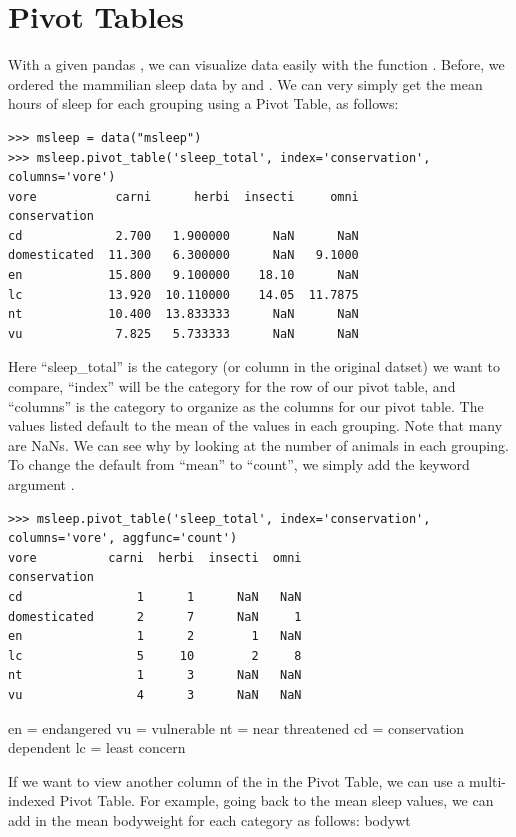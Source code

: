 \section*{Pivot Tables}
With a given pandas , we can visualize data easily with the function . Before, we ordered the mammilian sleep data by  and .  We can very simply get the mean hours of sleep for each grouping using a Pivot Table, as follows:

\begin{lstlisting}
>>> msleep = data("msleep")
>>> msleep.pivot_table('sleep_total', index='conservation', columns='vore')
vore           carni      herbi  insecti     omni
conservation                                     
cd             2.700   1.900000      NaN      NaN
domesticated  11.300   6.300000      NaN   9.1000
en            15.800   9.100000    18.10      NaN
lc            13.920  10.110000    14.05  11.7875
nt            10.400  13.833333      NaN      NaN
vu             7.825   5.733333      NaN      NaN
\end{lstlisting}

Here ``sleep\_total'' is the category (or column in the original datset) we want to compare, ``index'' will be the category for the row of our pivot table, and ``columns'' is the category to organize as the columns for our pivot table.  The values listed default to the mean of the values in each grouping.  Note that many are NaNs.  We can see why by looking at the number of animals in each grouping.  To change the default from ``mean'' to ``count'', we simply add the keyword argument .

\begin{lstlisting}
>>> msleep.pivot_table('sleep_total', index='conservation', columns='vore', aggfunc='count')
vore          carni  herbi  insecti  omni
conservation                             
cd                1      1      NaN   NaN
domesticated      2      7      NaN     1
en                1      2        1   NaN
lc                5     10        2     8
nt                1      3      NaN   NaN
vu                4      3      NaN   NaN
\end{lstlisting}

en = endangered
vu = vulnerable
nt = near threatened
cd = conservation dependent
lc = least concern

If we want to view another column of the  in the Pivot Table, we can use a multi-indexed Pivot Table.  For example, going back to the mean sleep values, we can add in the mean bodyweight for each category as follows: bodywt

